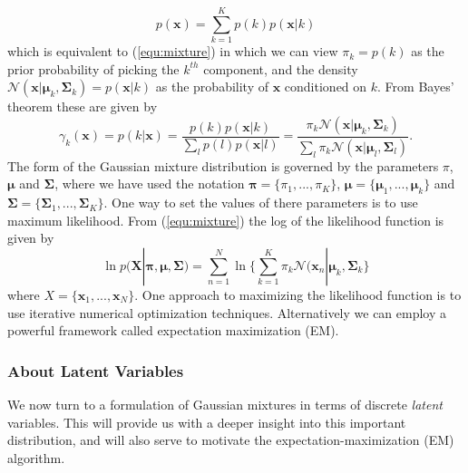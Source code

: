 \documentclass[a4paper, 11pt]{article}
\numberwithin{equation}{subsection}
\begin{document}
\begin{equation}
p(\mathbf x)=\sum_{k=1}^K p(k)p(\mathbf x|k)
\end{equation}
which is equivalent to (\ref{equ:mixture}) in which we can view $\pi_k=p(k)$ as the prior probability of picking the $k^{th}$ component, and the density $\mathcal N(\mathbf x|\boldsymbol\mu_k,\boldsymbol\Sigma_k)= p(\mathbf x|k)$ as the probability of $\mathbf x$ conditioned on $k$. From Bayes' theorem these are given by
\begin{equation}
\gamma_k(\mathbf x)=p(k|\mathbf x)=\frac{p(k)p(\mathbf x|k)}{\sum_lp(l)p(\mathbf x|l)}=\frac{\pi_k\mathcal N(\mathbf x|\boldsymbol\mu_k,\boldsymbol\Sigma_k)}{\boldsymbol\sum_l\pi_k\mathcal N(\mathbf x|\boldsymbol\mu_l,\boldsymbol\Sigma_l)}.
\end{equation}
The form of the Gaussian mixture distribution is governed by the parameters $\pi$, $\boldsymbol\mu$ and $\boldsymbol\Sigma$, where we have used the notation $\boldsymbol\pi=\{\pi_1,...,\pi_K\}$, $\boldsymbol\mu=\{\boldsymbol\mu_1,...,\boldsymbol\mu_k\}$ and $\boldsymbol\Sigma=\{\boldsymbol\Sigma_1,...,\boldsymbol\Sigma_K\}$. One way to set the values of there parameters is to use maximum likelihood. From (\ref{equ:mixture}) the log of the likelihood function is given by 
\begin{equation}
\ln p(\mathbf X|\boldsymbol\pi,\boldsymbol\mu,\boldsymbol\Sigma)=\sum_{n=1}^N\ln\{\sum_{k=1}^K\pi_k\mathcal N(\mathbf x_n|\boldsymbol\mu_k,\boldsymbol\Sigma_k\}
\end{equation}
where $X = \{\mathbf x_1,...,\mathbf x_N\}$. One approach to maximizing the likelihood function is to use iterative numerical optimization techniques. Alternatively we can employ a powerful framework called expectation maximization (EM).

\subsubsection{About Latent Variables}
We now turn to a formulation of Gaussian mixtures in terms of discrete \emph{latent} variables. This will provide us with a deeper insight into this important distribution, and will also serve to motivate the expectation-maximization (EM) algorithm.
\end{document}
